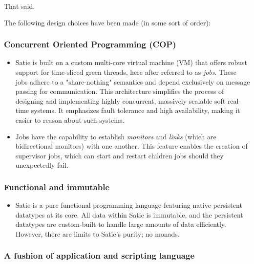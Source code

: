 That said.

The following design choices have been made (in some sort of order):

\hypertarget{concurrent-oriented-programming-cop}{%
\subsubsection{Concurrent Oriented Programming
(COP)}\label{concurrent-oriented-programming-cop}}

\begin{itemize}
\item
  Satie is built on a custom multi-core virtual machine (VM) that offers
  robust support for time-sliced green threads, here after referred to
  as \emph{jobs}. These jobs adhere to a "share-nothing" semantics and
  depend exclusively on message passing for communication. This
  architecture simplifies the process of designing and implementing
  highly concurrent, massively scalable soft real-time systems. It
  emphasizes fault tolerance and high availability, making it easier to
  reason about such systems.
\item
  Jobs have the capability to establish \emph{monitors} and \emph{links}
  (which are bidirectional monitors) with one another. This feature
  enables the creation of supervisor jobs, which can start and restart
  children jobs should they unexpectedly fail.
\end{itemize}

\hypertarget{functional-and-immutable}{%
\subsubsection{Functional and
immutable}\label{functional-and-immutable}}

\begin{itemize}
\tightlist
\item
  Satie is a pure functional programming language featuring native
  persistent datatypes at its core. All data within Satie is immutable,
  and the persistent datatypes are custom-built to handle large amounts
  of data efficiently. However, there are limits to Satie's purity; no
  monads.
\end{itemize}

\hypertarget{a-fushion-of-application-and-scripting-language}{%
\subsubsection{A fushion of application and scripting
language}\label{a-fushion-of-application-and-scripting-language}}

